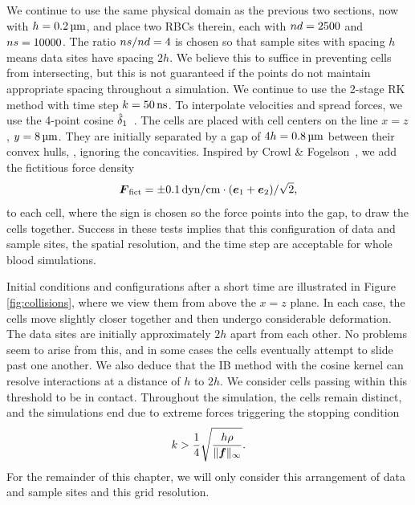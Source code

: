 We continue to use the same physical domain as the previous two sections, now with
$h = 0.2\um$, and place two RBCs therein, each with $\data\cardinality=2500$ and
$\sample\cardinality=10000$. The ratio $\sample\cardinality/\data\cardinality=4$ is
chosen so that sample sites with spacing $h$ means data sites have spacing $2h$. We
believe this to suffice in preventing cells from intersecting, but this is not guaranteed
if the points do not maintain appropriate spacing throughout a simulation. We continue
to use the 2-stage RK method with time step $\timestep = 50\ns$. To interpolate
velocities and spread forces, we use the 4-point cosine $\hat{\delta}_1$~\cite{Peskin:2002go}.
The cells are placed with cell centers on the line $x = z$, $y = 8\um$. They are
initially separated by a gap of $4h = 0.8\um$ between their convex hulls, ,
ignoring the concavities. Inspired by Crowl \& Fogelson~\cite{Erickson:2011cf}, we add
the fictitious force density
\begin{equation*}
    \F_\text{fict} = \pm 0.1\dynpercm\cdot(\e_1+\e_2)/\sqrt{2},
\end{equation*}
to each cell, where the sign is chosen so the force points into the gap, to draw the
cells together. Success in these tests implies that this configuration of data and sample
sites, the spatial resolution, and the time step are acceptable for whole blood
simulations.

Initial conditions and configurations after a short time are illustrated in Figure~%
\ref{fig:collisions}, where we view them from above the $x=z$ plane. In each case, the
cells move slightly closer together and then undergo considerable deformation. The data
sites are initially approximately $2h$ apart from each other. No problems seem to arise
from this, and in some cases the cells eventually attempt to slide past one another.  We
also deduce that the IB method with the cosine kernel can resolve interactions at a
distance of $h$ to $2h$. We consider cells passing within this threshold to be in
contact. Throughout the simulation, the cells remain distinct, and the simulations end
due to extreme forces triggering the stopping condition~\cite{Agresar:1998wv}
\begin{equation}
    k > \frac14\sqrt{\frac{h\rho}{\|\boldsymbol{f}\|_\infty}}.
\end{equation}
For the remainder of this chapter, we will only consider this arrangement of data and
sample sites and this grid resolution.
